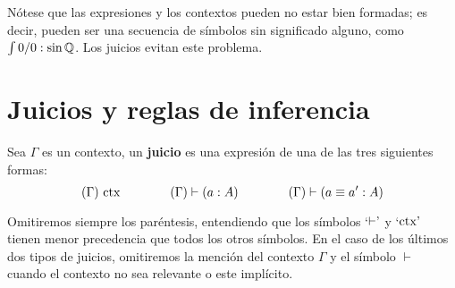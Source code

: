 \documentclass[../main.tex]{subfiles}
\begin{document}
Nótese que las expresiones y los contextos pueden no estar bien formadas; es decir, pueden ser una secuencia de símbolos sin significado alguno, como $\int 0/0 : \sin \mathbb{Q}$.
Los juicios evitan este problema.

\section{Juicios y reglas de inferencia}
\begin{definition}
    Sea $\Gamma$ es un contexto, un \textbf{juicio} es una expresión de una de las tres siguientes formas:
    $$(\Gamma) \textnormal{ ctx} \hspace{4em}  (\Gamma) \vdash (a:A) \hspace{4em}  (\Gamma) \vdash (a\equiv a':A)$$
\end{definition}
\begin{notation}
    Omitiremos siempre los paréntesis, entendiendo que los símbolos `${\vdash}\textrm'$ y `${\textnormal{ctx}}\textrm'$ tienen menor precedencia que todos los otros símbolos. En el caso de los últimos dos tipos de juicios, omitiremos la mención del contexto $\Gamma$ y el símbolo $\vdash$ cuando el contexto no sea relevante o este implícito.
\end{notation}
\end{document}
